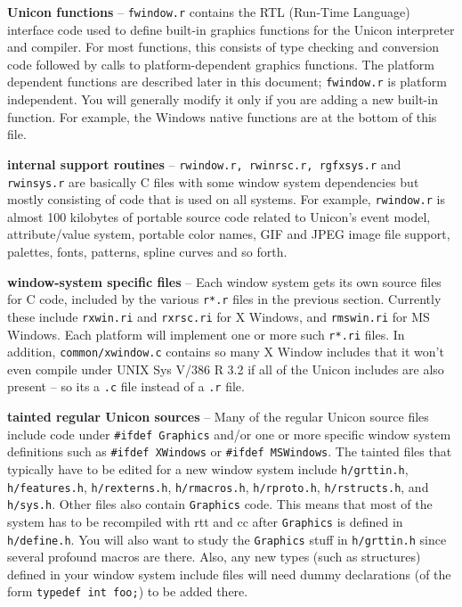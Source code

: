 \textbf{Unicon functions} -- \texttt{fwindow.r} contains the RTL
(Run-Time Language) interface code used to define built-in graphics
functions for the Unicon interpreter and compiler. For most functions,
this consists of type checking and conversion code followed by calls
to platform-dependent graphics functions. The platform dependent
functions are described later in this document; \texttt{fwindow.r} is
platform independent. You will generally modify it only if you are
adding a new built-in function. For example, the Windows native
functions are at the bottom of this file.

\textbf{internal support routines} -- \texttt{rwindow.r, rwinrsc.r,
rgfxsys.r} and \texttt{rwinsys.r} are basically C files with some
window system dependencies but mostly consisting of code that is used
on all systems. For example, \texttt{rwindow.r} is almost 100
kilobytes of portable source code related to Unicon's event model,
attribute/value system, portable color names, GIF and JPEG image file
support, palettes, fonts, patterns, spline curves and so forth.

\textbf{window-system specific files} -- Each window system gets its
own source files for C code, included by the various \texttt{r*.r}
files in the previous section. Currently these include
\texttt{rxwin.ri} and \texttt{rxrsc.ri} for X Windows, and
\texttt{rmswin.ri} for MS Windows. Each platform will implement
one or more such \texttt{r*.ri} files. In addition,
\texttt{common/xwindow.c} contains so many X Window includes that it
won't even compile under UNIX Sys V/386 R 3.2 if all of the Unicon
includes are also present -- so its a \texttt{.c} file instead of a
\texttt{.r} file.

\textbf{tainted {\textquotedbl}regular{\textquotedbl} Unicon sources}
-- Many of the regular Unicon source files include code under
\texttt{\#ifdef Graphics} and/or one or more specific window system
definitions such as \texttt{\#ifdef XWindows} or \texttt{\#ifdef
MSWindows}. The tainted files that typically have to be
edited for a new window system include \texttt{h/grttin.h},
\texttt{h/features.h}, \texttt{h/rexterns.h}, \texttt{h/rmacros.h},
\texttt{h/rproto.h}, \texttt{h/rstructs.h}, and
\texttt{h/sys.h}. Other files also contain \texttt{Graphics}
code. This means that most of the system has to be recompiled with rtt
and cc after \texttt{Graphics} is defined in \texttt{h/define.h}. You
will also want to study the \texttt{Graphics} stuff in
\texttt{h/grttin.h} since several profound macros are there. Also, any
new types (such as structures) defined in your window system include
files will need dummy declarations (of the form \texttt{typedef int
foo;}) to be added there.

